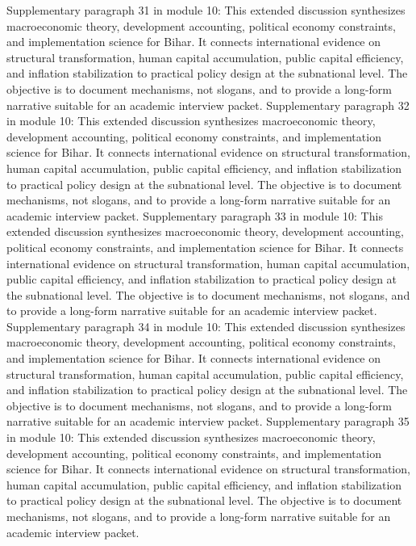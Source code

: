 \documentclass[preprint,12pt]{elsarticle}
\begin{document}
Supplementary paragraph 31 in module 10: This extended discussion synthesizes macroeconomic theory, development accounting, political economy constraints, and implementation science for Bihar. It connects international evidence on structural transformation, human capital accumulation, public capital efficiency, and inflation stabilization to practical policy design at the subnational level. The objective is to document mechanisms, not slogans, and to provide a long-form narrative suitable for an academic interview packet.
Supplementary paragraph 32 in module 10: This extended discussion synthesizes macroeconomic theory, development accounting, political economy constraints, and implementation science for Bihar. It connects international evidence on structural transformation, human capital accumulation, public capital efficiency, and inflation stabilization to practical policy design at the subnational level. The objective is to document mechanisms, not slogans, and to provide a long-form narrative suitable for an academic interview packet.
Supplementary paragraph 33 in module 10: This extended discussion synthesizes macroeconomic theory, development accounting, political economy constraints, and implementation science for Bihar. It connects international evidence on structural transformation, human capital accumulation, public capital efficiency, and inflation stabilization to practical policy design at the subnational level. The objective is to document mechanisms, not slogans, and to provide a long-form narrative suitable for an academic interview packet.
Supplementary paragraph 34 in module 10: This extended discussion synthesizes macroeconomic theory, development accounting, political economy constraints, and implementation science for Bihar. It connects international evidence on structural transformation, human capital accumulation, public capital efficiency, and inflation stabilization to practical policy design at the subnational level. The objective is to document mechanisms, not slogans, and to provide a long-form narrative suitable for an academic interview packet.
Supplementary paragraph 35 in module 10: This extended discussion synthesizes macroeconomic theory, development accounting, political economy constraints, and implementation science for Bihar. It connects international evidence on structural transformation, human capital accumulation, public capital efficiency, and inflation stabilization to practical policy design at the subnational level. The objective is to document mechanisms, not slogans, and to provide a long-form narrative suitable for an academic interview packet.
\end{document}

